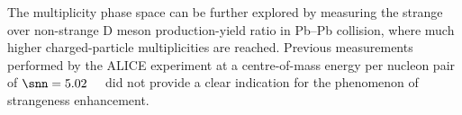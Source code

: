 
\begin{sloppypar}
The multiplicity phase space can be further explored by measuring the strange over non-strange D meson production-yield ratio in Pb--Pb collision, where much higher charged-particle multiplicities are reached. Previous measurements performed by the ALICE experiment at a centre-of-mass energy per nucleon pair of \mbox{$\snn=5.02$~\tev~\cite{ALICE:2021kfc}} did not provide a clear indication for the phenomenon of strangeness enhancement. %
\end{sloppypar}


